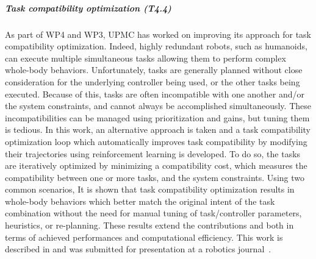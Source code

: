 \subparagraph{Task compatibility optimization (T4.4)}

As part of WP4 and WP3, UPMC has worked on improving its approach for task compatibility optimization. Indeed, highly redundant robots, such as humanoids, can execute multiple simultaneous tasks allowing them to perform complex whole-body behaviors. Unfortunately, tasks are generally planned without close consideration for the underlying controller being used, or the other tasks being executed. Because of this, tasks are often incompatible with one another and/or the system constraints, and cannot always be accomplished simultaneously. These incompatibilities can be managed using prioritization and gains, but tuning them is tedious. In this work, an alternative approach is taken and a task compatibility optimization loop which automatically improves task compatibility by modifying their trajectories using reinforcement learning is developed. To do so, the tasks are iteratively optimized by minimizing a compatibility cost, which measures the compatibility between one or more tasks, and the system constraints. Using two common scenarios, It is shown that task compatibility optimization results in whole-body behaviors which better match the original intent of the task combination without the need for manual tuning of task/controller parameters, heuristics, or re-planning. These results extend the contributions \cite{lober-HUMANOIDS2014} and \cite{lober_IROS2015} both in terms of achieved performances and computational efficiency. This work is described in \cite{deliverable33} and was submitted for presentation at a robotics journal~\cite{lober2017RAL-IROS}.

